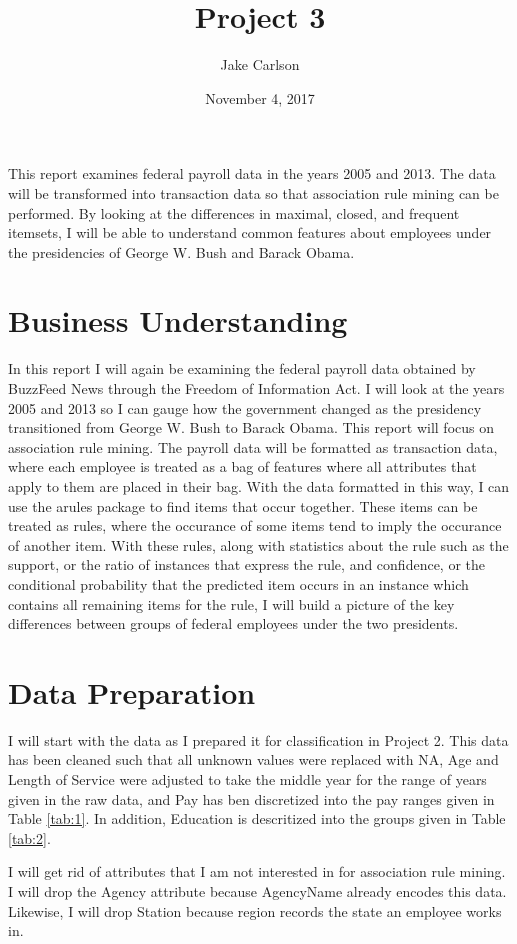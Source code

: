 \documentclass{article}
\begin{document}
\title{Project 3}
\author{Jake Carlson}
\date{November 4, 2017}
\maketitle

\abstract
This report examines federal payroll data in the years 2005 and 2013. The data will be transformed into transaction data so that association rule mining can be performed. By looking at the differences in maximal, closed, and frequent itemsets, I will be able to understand common features about employees under the presidencies of George W. Bush and Barack Obama.

\newpage

\tableofcontents
\newpage

\section{Business Understanding}
In this report I will again be examining the federal payroll data obtained by BuzzFeed News through the Freedom of Information Act. I will look at the years 2005 and 2013 so I can gauge how the government changed as the presidency transitioned from George W. Bush to Barack Obama. This report will focus on association rule mining. The payroll data will be formatted as transaction data, where each employee is treated as a bag of features where all attributes that apply to them are placed in their bag. With the data formatted in this way, I can use the arules package to find items that occur together. These items can be treated as rules, where the occurance of some items tend to imply the occurance of another item. With these rules, along with statistics about the rule such as the support, or the ratio of instances that express the rule, and confidence, or the conditional probability that the predicted item occurs in an instance which contains all remaining items for the rule, I will build a picture of the key differences between groups of federal employees under the two presidents.

\section{Data Preparation}
I will start with the data as I prepared it for classification in Project 2. This data has been cleaned such that all unknown values were replaced with NA, Age and Length of Service were adjusted to take the middle year for the range of years given in the raw data, and Pay has ben discretized into the pay ranges given in Table \ref{tab:1}. In addition, Education is descritized into the groups given in Table \ref{tab:2}.
\par
I will get rid of attributes that I am not interested in for association rule mining. I will drop the Agency attribute because AgencyName already encodes this data. Likewise, I will drop Station because region records the state an employee works in.
\end{document}
